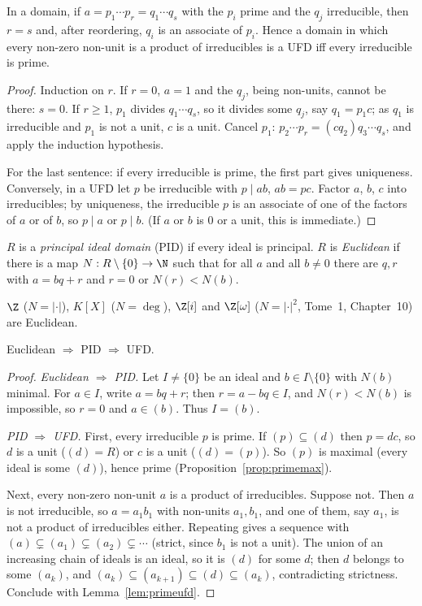 \begin{lemma}\label{lem:primeufd}
In a domain, if $a=p_1\cdots p_r=q_1\cdots q_s$ with the $p_i$ prime and the $q_j$ irreducible, then $r=s$ and, after reordering, $q_i$ is an associate of $p_i$. Hence a domain in which every non-zero non-unit is a product of irreducibles is a UFD iff every irreducible is prime.
\end{lemma}
\begin{proof}
Induction on $r$. If $r=0$, $a=1$ and the $q_j$, being non-units, cannot be there: $s=0$. If $r\ge1$, $p_1$ divides $q_1\cdots q_s$, so it divides some $q_j$, say $q_1=p_1c$; as $q_1$ is irreducible and $p_1$ is not a unit, $c$ is a unit. Cancel $p_1$: $p_2\cdots p_r=(cq_2)q_3\cdots q_s$, and apply the induction hypothesis.

For the last sentence: if every irreducible is prime, the first part gives uniqueness. Conversely, in a UFD let $p$ be irreducible with $p\mid ab$, $ab=pc$. Factor $a$, $b$, $c$ into irreducibles; by uniqueness, the irreducible $p$ is an associate of one of the factors of $a$ or of $b$, so $p\mid a$ or $p\mid b$. (If $a$ or $b$ is $0$ or a unit, this is immediate.)
\end{proof}

\begin{definition}
$R$ is a \emph{principal ideal domain} (PID) if every ideal is principal. $R$ is \emph{Euclidean} if there is a map $N:R\setminus\{0\}\to\N$ such that for all $a$ and all $b\ne0$ there are $q,r$ with $a=bq+r$ and $r=0$ or $N(r)<N(b)$.
\end{definition}

$\Z$ ($N=|\cdot|$), $K[X]$ ($N=\deg$), $\Z[i]$ and $\Z[\omega]$ ($N=|\cdot|^2$, Tome~1, Chapter~10) are Euclidean.

\begin{theorem}\label{thm:edpidufd}
Euclidean $\Rightarrow$ PID $\Rightarrow$ UFD.
\end{theorem}
\begin{proof}
\emph{Euclidean $\Rightarrow$ PID.} Let $I\ne\{0\}$ be an ideal and $b\in I\setminus\{0\}$ with $N(b)$ minimal. For $a\in I$, write $a=bq+r$; then $r=a-bq\in I$, and $N(r)<N(b)$ is impossible, so $r=0$ and $a\in(b)$. Thus $I=(b)$.

\emph{PID $\Rightarrow$ UFD.} First, every irreducible $p$ is prime. If $(p)\subseteq(d)$ then $p=dc$, so $d$ is a unit ($(d)=R$) or $c$ is a unit ($(d)=(p)$). So $(p)$ is maximal (every ideal is some $(d)$), hence prime (Proposition~\ref{prop:primemax}).

Next, every non-zero non-unit $a$ is a product of irreducibles. Suppose not. Then $a$ is not irreducible, so $a=a_1b_1$ with non-units $a_1,b_1$, and one of them, say $a_1$, is not a product of irreducibles either. Repeating gives a sequence with $(a)\subsetneq(a_1)\subsetneq(a_2)\subsetneq\cdots$ (strict, since $b_1$ is not a unit). The union of an increasing chain of ideals is an ideal, so it is $(d)$ for some $d$; then $d$ belongs to some $(a_k)$, and $(a_k)\subseteq(a_{k+1})\subseteq(d)\subseteq(a_k)$, contradicting strictness. Conclude with Lemma~\ref{lem:primeufd}.
\end{proof}

